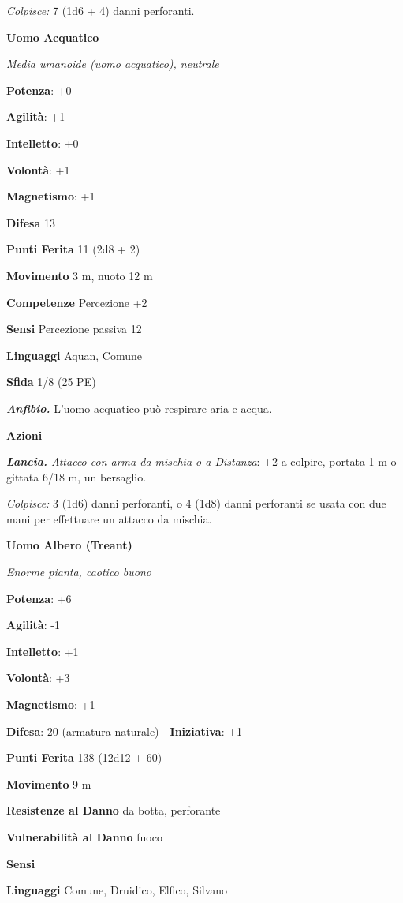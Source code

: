 \begin{multicols}{2}
\emph{Colpisce:} 7 (1d6 + 4) danni perforanti.

\textbf{Uomo Acquatico}

\emph{Media umanoide (uomo acquatico), neutrale}

\textbf{Potenza}: +0

\textbf{Agilità}: +1

\textbf{Intelletto}: +0

\textbf{Volontà}: +1

\textbf{Magnetismo}: +1

\textbf{Difesa} 13

\textbf{Punti Ferita} 11 (2d8 + 2)

\textbf{Movimento} 3 m, nuoto 12 m

\textbf{Competenze} Percezione +2

\textbf{Sensi} Percezione passiva 12

\textbf{Linguaggi} Aquan, Comune

\textbf{Sfida} 1/8 (25 PE)\smallskip

\emph{\textbf{Anfibio.}} L'uomo acquatico può respirare aria e acqua.

\smallskip\textbf{Azioni}

\emph{\textbf{Lancia.} Attacco con arma da mischia o a Distanza}: +2 a
colpire, portata 1 m o gittata 6/18 m, un bersaglio.

\emph{Colpisce:} 3 (1d6) danni perforanti, o 4 (1d8) danni perforanti se
usata con due mani per effettuare un attacco da mischia.

\textbf{Uomo Albero (Treant)}

\emph{Enorme pianta, caotico buono}

\textbf{Potenza}: +6

\textbf{Agilità}: -1

\textbf{Intelletto}: +1

\textbf{Volontà}: +3

\textbf{Magnetismo}: +1

\textbf{Difesa}: 20 (armatura naturale) - \textbf{Iniziativa}: +1

\textbf{Punti Ferita} 138 (12d12 + 60)

\textbf{Movimento} 9 m

\textbf{Resistenze al Danno} da botta, perforante

\textbf{Vulnerabilità al Danno} fuoco

\textbf{Sensi} 

\textbf{Linguaggi} Comune, Druidico, Elfico, Silvano


\end{multicols}
